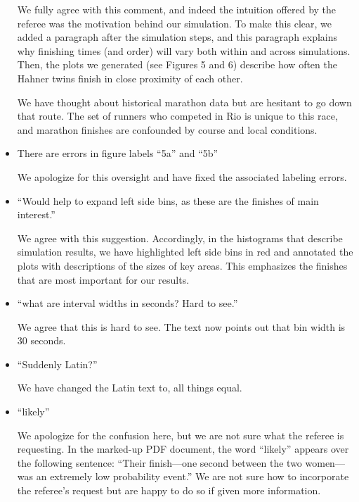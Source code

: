 \documentclass[12pt]{article}
\begin{document}
\begin{itemize}
  We fully agree with this comment, and indeed the intuition offered
  by the referee was the motivation behind our simulation.  To make
  this clear, we added a paragraph after the simulation steps, and
  this paragraph explains why finishing times (and order) will vary
  both within and across simulations.  Then, the plots we generated
  (see Figures 5 and 6) describe how often the Hahner twins finish
  in close proximity of each other.

  We have thought about historical marathon data but are hesitant to
  go down that route.  The set of runners who competed in Rio is
  unique to this race, and marathon finishes are confounded by course
  and local conditions.
  
\item There are errors in figure labels ``5a'' and ``5b''
  
  We apologize for this oversight and have fixed the associated
  labeling errors.

\item ``Would help to expand left side bins, as these are the finishes
  of main interest.''
  
  We agree with this suggestion.  Accordingly, in the histograms that
  describe simulation results, we have highlighted left side bins in
  red and annotated the plots with descriptions of the sizes of key
  areas.  This emphasizes the finishes that are most important for our
  results.

\item ``what are interval widths in seconds? Hard to see.''

  We agree that this is hard to see.  The text now points out that bin
  width is 30 seconds.

\item ``Suddenly Latin?''
  
  We have changed the Latin text to, all things equal.
  
\item ``likely''

  We apologize for the confusion here, but we are not sure what the
  referee is requesting.  In the marked-up PDF document, the word
  ``likely'' appears over the following sentence: ``Their finish—one
  second between the two women—was an extremely low probability
  event.''  We are not sure how to incorporate the referee's request
  but are happy to do so if given more information.

\end{itemize}

 
\end{document}
